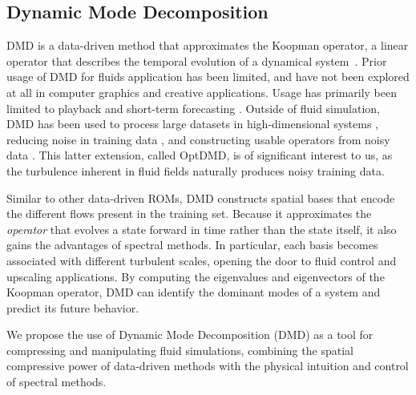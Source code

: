 \subsection{Dynamic Mode Decomposition}
\label{sec:dmd_related_works}


DMD is a data-driven method that approximates the Koopman operator, a linear operator that describes the temporal evolution of a dynamical system~\cite{schmid2010dynamic}.
Prior usage of DMD for fluids application has been limited, and have not been explored at all in computer graphics and creative applications.
Usage has primarily been limited to playback and short-term forecasting \cite{proctor2016dynamic}. 
Outside of fluid simulation, DMD has been used to process large datasets in high-dimensional systems \cite{williams2015data}, reducing noise in training data \cite{askham2018variable}, and constructing usable operators from noisy data \cite{sashidhar2022bagging}. This latter extension, called OptDMD, is of significant interest to us, as the turbulence inherent in fluid fields naturally produces noisy training data.


Similar to other data-driven ROMs, DMD constructs spatial bases that encode the different flows present in the training set. 
Because it approximates the \emph{operator} that evolves a state forward in time rather than the state itself, it also gains the advantages of spectral methods. 
In particular, each basis becomes associated with different turbulent scales, opening the door to fluid control and upscaling applications. By computing the eigenvalues and eigenvectors of the Koopman operator, DMD can identify the dominant modes of a system and predict its future behavior.

We propose the use of Dynamic Mode Decomposition (DMD) as a tool for compressing and manipulating fluid simulations, combining the spatial compressive power of data-driven methods with the physical intuition and control of spectral methods. 


